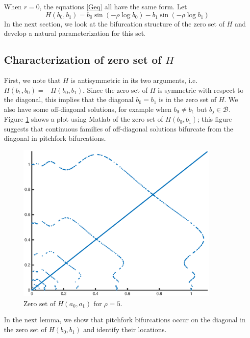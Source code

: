 \documentclass[thesis.tex]{subfiles}
\begin{document}
When $r = 0$, the equations \eqref{Geq} all have the same form. Let
\begin{equation}\label{defH}
H(b_0, b_1) = b_0 \sin \left( -\rho \log b_0 \right) - b_1 \sin \left( -\rho \log b_1 \right)
\end{equation}
In the next section, we look at the bifurcation structure of the zero set of $H$ and develop a natural parameterization for this set. 

\subsection{Characterization of zero set of $H$}

First, we note that $H$ is antisymmetric in its two arguments, i.e. $H(b_1, b_0) = -H(b_0, b_1)$. Since the zero set of $H$ is symmetric with respect to the diagonal, this implies that the diagonal $b_0 = b_1$ is in the zero set of $H$. We also have some off-diagonal solutions, for example when $b_0 \neq b_1$ but $b_j \in \mathcal{B}$. Figure \ref{fig:Fzeronumeric} shows a plot using Matlab of the zero set of $H(b_0, b_1)$; this figure suggests that continuous families of off-diagonal solutions bifurcate from the diagonal in pitchfork bifurcations.

\begin{figure}[H]
\label{fig:Fzeronumeric}
\includegraphics[width=10cm]{periodic/zeroset5}
\caption{Zero set of $H(a_0, a_1)$ for $\rho = 5$.}
\end{figure} 

In the next lemma, we show that pitchfork bifurcations occur on the diagonal in the zero set of $H(b_0, b_1)$ and identify their locations.
\end{document}

